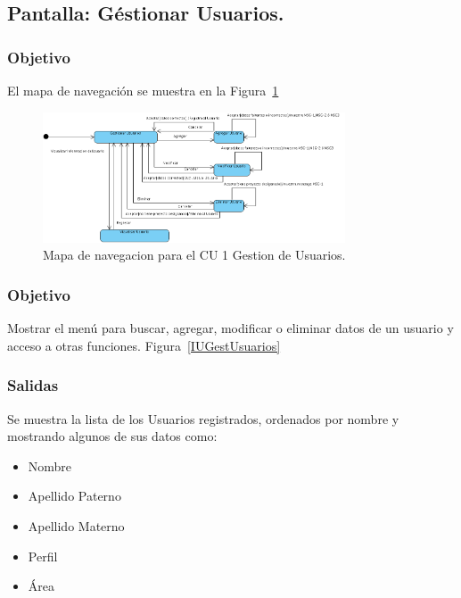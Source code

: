 \subsection{Pantalla: Géstionar Usuarios.}
\subsubsection{Objetivo}
	El mapa de navegación se muestra en la Figura~\ref{fig:mapaNavegacionCU1}

   \begin{figure}[hbpt!]
 		\centering
 			\includegraphics[width=0.8\textwidth]{images/CU1/NavegacionUsuarios.png}
 		\caption{Mapa de navegacion para el CU 1 Gestion de Usuarios.}
		\label{fig:mapaNavegacionCU1}
 	\end{figure}

\subsubsection{Objetivo}
Mostrar el menú para buscar, agregar, modificar o eliminar datos de un usuario y acceso a otras funciones.
Figura~\ref{IUGestUsuarios}

\subsubsection{Salidas}
Se muestra la lista de los Usuarios registrados, ordenados por nombre y mostrando algunos de sus datos como:
\begin{itemize}
 \item Nombre
 \item Apellido Paterno
 \item Apellido Materno
 \item Perfil
 \item Área
\end{itemize}

